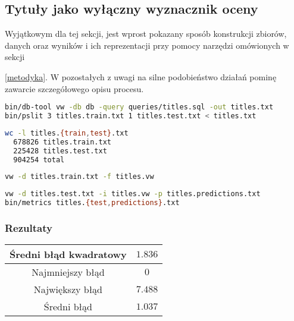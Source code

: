 \documentclass{article}
\newcommand{\sql}[2]{

}
\begin{document}
\subsection{Tytuły jako wyłączny wyznacznik oceny}

Wyjątkowym dla tej sekcji, jest wprost pokazany sposób konstrukcji zbiorów, danych oraz wyników i ich reprezentacji przy pomocy narzędzi omówionych w sekcji {\ref{metodyka}. W pozostałych z uwagi na silne podobieństwo działań pominę zawarcie szczegółowego opisu procesu.

\sql{Kwerenda wyznaczająca tytuły filmów oraz ich oceny}{./queries/titles.sql}

\begin{lstlisting}[language=bash,caption=Przygotowanie danych dla modelu i ewaluacji,label=query1]
bin/db-tool vw -db db -query queries/titles.sql -out titles.txt
bin/pslit 3 titles.train.txt 1 titles.test.txt < titles.txt
\end{lstlisting}

\begin{lstlisting}[language=bash,caption=Wielkości zbiorów]
wc -l titles.{train,test}.txt
  678826 titles.train.txt
  225428 titles.test.txt
  904254 total
\end{lstlisting}

\begin{lstlisting}[language=bash, caption=Generowanie modelu]
vw -d titles.train.txt -f titles.vw
\end{lstlisting}

\begin{lstlisting}[language=bash, caption=Ewaluacja modelu]
vw -d titles.test.txt -i titles.vw -p titles.predictions.txt
bin/metrics titles.{test,predictions}.txt
\end{lstlisting}

\subsubsection{Rezultaty}

\begin{center}
\begin{tabular}{ |c|c| }
\hline	Średni błąd kwadratowy & \( 1.836 \) \\
\hline	Najmniejszy błąd & \( 0 \) \\
\hline	Największy błąd & \( 7.488 \) \\
\hline	Średni błąd & \( 1.037 \) \\
\hline
\end{tabular}
\end{center}

}
\end{document}
